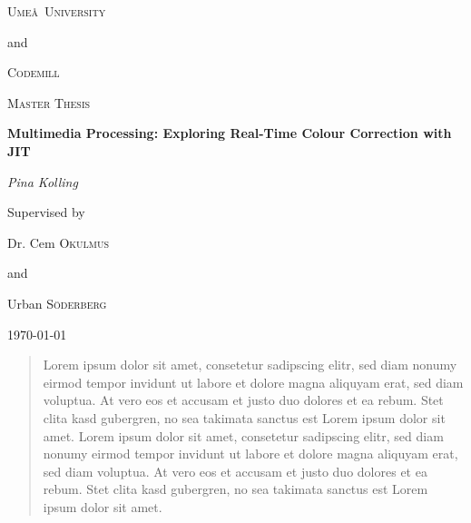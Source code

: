 \documentclass[12pt,a4paper]{article}
\begin{document}
	


\begin{titlepage}
	\centering
	{\scshape\LARGE Ume\aa \  University \par}
	and \par
	{\scshape\LARGE Codemill \par}
	\vspace{1cm}
	{\scshape\Large Master Thesis \par }
	\vspace{1.5cm}
	{\huge\bfseries  Multimedia Processing: Exploring Real-Time Colour Correction with JIT \par}
	\vspace{2cm}
	{\Large\itshape Pina Kolling\par}
	\vfill
	Supervised by\par
	Dr. Cem \textsc{Okulmus} \par 
	and \par 
	Urban \textsc{Söderberg} 
	
	\vfill
	
	{\large \today \par}
\end{titlepage}

\begin{abstract}
	\noindent Lorem ipsum dolor sit amet, consetetur sadipscing elitr, sed diam nonumy eirmod tempor invidunt ut labore et dolore magna aliquyam erat, sed diam voluptua. At vero eos et accusam et justo duo dolores et ea rebum. Stet clita kasd gubergren, no sea takimata sanctus est Lorem ipsum dolor sit amet. Lorem ipsum dolor sit amet, consetetur sadipscing elitr, sed diam nonumy eirmod tempor invidunt ut labore et dolore magna aliquyam erat, sed diam voluptua. At vero eos et accusam et justo duo dolores et ea rebum. Stet clita kasd gubergren, no sea takimata sanctus est Lorem ipsum dolor sit amet.
\end{abstract}

\newpage


\setcounter{page}{1}



		
\end{document}
